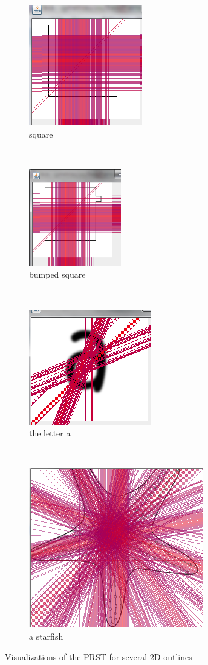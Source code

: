 \documentclass[10pt,a4paper]{article}                        %
\begin{document}
\begin{figure}[h]
        \centering
        \begin{subfigure}{120 pt}
                \includegraphics[height=120 pt]{img/carre2_5000.png}
                \caption{square}
                \label{square}
        \end{subfigure}
        ~
        \begin{subfigure}{120 pt}
                \includegraphics[height = 120pt]{img/carre3_5000_bis.png}
                \caption{bumped square}
                \label{bump_square}
        \end{subfigure}
       
       ~\\
        \begin{subfigure}{120 pt}
         \includegraphics[height=120 pt]{img/sample_1000_seuil_07.png}
         \caption{the letter a}
                \label{a}
                   \end{subfigure}
        ~
        \begin{subfigure}{120 pt}
         \includegraphics[height=120 pt]{img/n_32_sample2000_seuil06.png}
         \caption{a starfish}
                \label{star}
              \end{subfigure}     
                \caption{Visualizations of the PRST for several 2D outlines}
        \label{visualization}
\end{figure}
\end{document}
